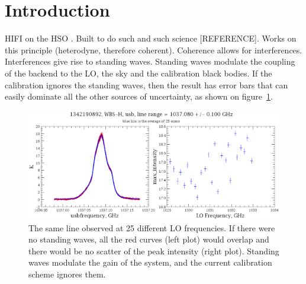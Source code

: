 \documentclass[a4paper,11pt]{article}
\title{}
\author{}
\begin{document}
\maketitle

\begin{abstract}
\end{abstract}






\section{Introduction}
HIFI \cite{AA_518_L6} on the HSO \cite{AA_518_L1}.
Built to do such and such science [REFERENCE].
Works on this principle (heterodyne, therefore coherent).
Coherence allows for interferences.
Interferences give rise to standing waves.
Standing waves modulate the coupling of the backend to the LO, the sky and the calibration black bodies.
If the calibration ignores the standing waves, then the result has error bars that can easily dominate all the other sources of uncertainty, as shown on figure~\ref{fig:scatter_real_data}.

\begin{figure}
    \centering
    \includegraphics[width=\textwidth]{1342190892_4a_line_frequency_1037-080GHz_level_usb_20_WBS-H_max_intensity}
    \caption{\label{fig:scatter_real_data}The same line observed at 25 different LO frequencies.  If there were no standing waves, all the red curves (left plot) would overlap and there would be no scatter of the peak intensity (right plot).  Standing waves modulate the gain of the system, and the current calibration scheme ignores them.}
\end{figure}
\end{document}
